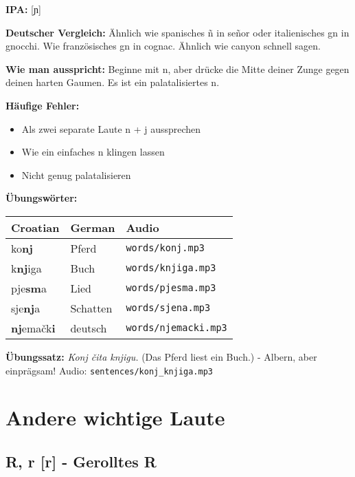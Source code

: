 \begin{tcolorbox}[colback=lightgreen!30, colframe=green!60!black, title=\textbf{Nj, nj}]

\textbf{IPA:} [ɲ]

\textbf{Deutscher Vergleich:}
Ähnlich wie spanisches \glqq ñ\grqq{} in \glqq señor\grqq{} oder italienisches \glqq gn\grqq{} in \glqq gnocchi\grqq{}. Wie französisches \glqq gn\grqq{} in \glqq cognac\grqq{}. Ähnlich wie \glqq canyon\grqq{} schnell sagen.

\textbf{Wie man ausspricht:}
Beginne mit \glqq n\grqq{}, aber drücke die Mitte deiner Zunge gegen deinen harten Gaumen. Es ist ein palatalisiertes \glqq n\grqq{}.

\textbf{Häufige Fehler:}
\begin{itemize}
    \item Als zwei separate Laute \glqq n\grqq{} + \glqq j\grqq{} aussprechen
    \item Wie ein einfaches \glqq n\grqq{} klingen lassen
    \item Nicht genug palatalisieren
\end{itemize}

\textbf{Übungswörter:}
\begin{tabular}{lll}
\textbf{Croatian} & \textbf{German} & \textbf{Audio} \\
\midrule
ko\textbf{nj} & Pferd & \texttt{words/konj.mp3} \\
k\textbf{nj}iga & Buch & \texttt{words/knjiga.mp3} \\
pje\textbf{sm}a & Lied & \texttt{words/pjesma.mp3} \\
sje\textbf{nj}a & Schatten & \texttt{words/sjena.mp3} \\
\textbf{nj}emačk\textbf{i} & deutsch & \texttt{words/njemacki.mp3} \\
\end{tabular}

\textbf{Übungssatz:}
\textit{Konj čita knjigu.}
(Das Pferd liest ein Buch.) - Albern, aber einprägsam!
Audio: \texttt{sentences/konj\_knjiga.mp3}

\end{tcolorbox}

\section{Andere wichtige Laute}

\subsection{R, r [r] - \glqq Gerolltes R\grqq{}}

